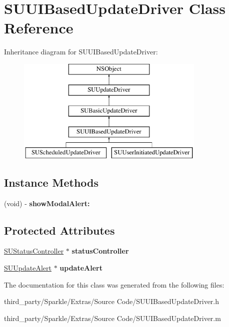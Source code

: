 \hypertarget{interface_s_u_u_i_based_update_driver}{}\section{S\+U\+U\+I\+Based\+Update\+Driver Class Reference}
\label{interface_s_u_u_i_based_update_driver}
Inheritance diagram for S\+U\+U\+I\+Based\+Update\+Driver\+:\begin{figure}[H]
\begin{center}
\leavevmode
\includegraphics[height=5.000000cm]{interface_s_u_u_i_based_update_driver}
\end{center}
\end{figure}
\subsection*{Instance Methods}
\begin{DoxyCompactItemize}
\item 
\mbox{\label{interface_s_u_u_i_based_update_driver_a61b6975b49a8ba686b68eb6f984c95a6}} 
(void) -\/ {\bfseries show\+Modal\+Alert\+:}
\end{DoxyCompactItemize}
\subsection*{Protected Attributes}
\begin{DoxyCompactItemize}
\item 
\mbox{\label{interface_s_u_u_i_based_update_driver_a703a0900f6eb948ea2b1f33d2922f314}} 
\mbox{\hyperlink{interface_s_u_status_controller}{S\+U\+Status\+Controller}} $\ast$ {\bfseries status\+Controller}
\item 
\mbox{\label{interface_s_u_u_i_based_update_driver_a2de311b3da172bda356179a2d005751f}} 
\mbox{\hyperlink{interface_s_u_update_alert}{S\+U\+Update\+Alert}} $\ast$ {\bfseries update\+Alert}
\end{DoxyCompactItemize}


The documentation for this class was generated from the following files\+:\begin{DoxyCompactItemize}
\item 
third\+\_\+party/\+Sparkle/\+Extras/\+Source Code/S\+U\+U\+I\+Based\+Update\+Driver.\+h\item 
third\+\_\+party/\+Sparkle/\+Extras/\+Source Code/S\+U\+U\+I\+Based\+Update\+Driver.\+m\end{DoxyCompactItemize}
